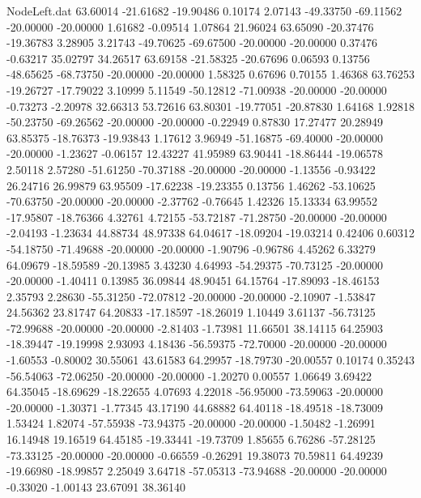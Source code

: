 \begin{filecontents}{NodeLeft.dat}
  63.60014  -21.61682  -19.90486     0.10174    2.07143  -49.33750  -69.11562  -20.00000  -20.00000    1.61682   -0.09514    1.07864   21.96024
  63.65090  -20.37476  -19.36783     3.28905    3.21743  -49.70625  -69.67500  -20.00000  -20.00000    0.37476   -0.63217   35.02797   34.26517
  63.69158  -21.58325  -20.67696     0.06593    0.13756  -48.65625  -68.73750  -20.00000  -20.00000    1.58325    0.67696    0.70155    1.46368
  63.76253  -19.26727  -17.79022     3.10999    5.11549  -50.12812  -71.00938  -20.00000  -20.00000   -0.73273   -2.20978   32.66313   53.72616
  63.80301  -19.77051  -20.87830     1.64168    1.92818  -50.23750  -69.26562  -20.00000  -20.00000   -0.22949    0.87830   17.27477   20.28949
  63.85375  -18.76373  -19.93843     1.17612    3.96949  -51.16875  -69.40000  -20.00000  -20.00000   -1.23627   -0.06157   12.43227   41.95989
  63.90441  -18.86444  -19.06578     2.50118    2.57280  -51.61250  -70.37188  -20.00000  -20.00000   -1.13556   -0.93422   26.24716   26.99879
  63.95509  -17.62238  -19.23355     0.13756    1.46262  -53.10625  -70.63750  -20.00000  -20.00000   -2.37762   -0.76645    1.42326   15.13334
  63.99552  -17.95807  -18.76366     4.32761    4.72155  -53.72187  -71.28750  -20.00000  -20.00000   -2.04193   -1.23634   44.88734   48.97338
  64.04617  -18.09204  -19.03214     0.42406    0.60312  -54.18750  -71.49688  -20.00000  -20.00000   -1.90796   -0.96786    4.45262    6.33279
  64.09679  -18.59589  -20.13985     3.43230    4.64993  -54.29375  -70.73125  -20.00000  -20.00000   -1.40411    0.13985   36.09844   48.90451
  64.15764  -17.89093  -18.46153     2.35793    2.28630  -55.31250  -72.07812  -20.00000  -20.00000   -2.10907   -1.53847   24.56362   23.81747
  64.20833  -17.18597  -18.26019     1.10449    3.61137  -56.73125  -72.99688  -20.00000  -20.00000   -2.81403   -1.73981   11.66501   38.14115
  64.25903  -18.39447  -19.19998     2.93093    4.18436  -56.59375  -72.70000  -20.00000  -20.00000   -1.60553   -0.80002   30.55061   43.61583
  64.29957  -18.79730  -20.00557     0.10174    0.35243  -56.54063  -72.06250  -20.00000  -20.00000   -1.20270    0.00557    1.06649    3.69422
  64.35045  -18.69629  -18.22655     4.07693    4.22018  -56.95000  -73.59063  -20.00000  -20.00000   -1.30371   -1.77345   43.17190   44.68882
  64.40118  -18.49518  -18.73009     1.53424    1.82074  -57.55938  -73.94375  -20.00000  -20.00000   -1.50482   -1.26991   16.14948   19.16519
  64.45185  -19.33441  -19.73709     1.85655    6.76286  -57.28125  -73.33125  -20.00000  -20.00000   -0.66559   -0.26291   19.38073   70.59811
  64.49239  -19.66980  -18.99857     2.25049    3.64718  -57.05313  -73.94688  -20.00000  -20.00000   -0.33020   -1.00143   23.67091   38.36140

\end{filecontents}
